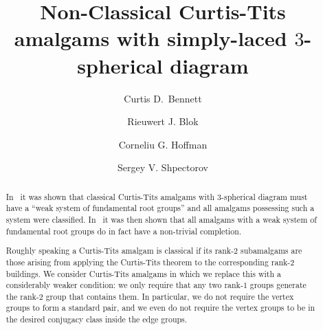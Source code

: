 \documentclass[12pt]{amsart}
\theoremstyle{definition}
\begin{document}
\title[Non-classical amalgams]{Non-Classical Curtis-Tits amalgams with simply-laced $3$-spherical diagram}

\author[Bennett]{Curtis D.~Bennett}
\address{Frank R. Seaver College of Science and Engineering \\
Loyola Marymount University\\
Los Angeles, CA 90245\\
U.S.A.
}

\author[Blok]{Rieuwert J. Blok}
\address{Department of Mathematics and Statistics\\
Bowling Green State University\\
Bowling Green, oh 43403\\
U.S.A.
}

\author[Hoffman]{Corneliu G. Hoffman}
\address{School of Mathematics\\
University of Birmingham\\
Edgbaston, B15 2TT\\
U.K.
}

\author[Shpectorov]{Sergey V. Shpectorov}
\address{School of Mathematics\\
University of Birmingham\\
Edgbaston, B15 2TT\\
U.K.}

\begin{abstract}
In~\cite{BlHoSh2017} it was shown that classical Curtis-Tits amalgams with $3$-spherical diagram must have a ``weak system of fundamental root groups'' and all amalgams possessing such a system were classified. In~\cite{BlHo2017} it was then shown that all amalgams with a weak system of fundamental root groups do in fact have a non-trivial completion. 

Roughly speaking a Curtis-Tits amalgam is classical if its rank-$2$ subamalgams are those arising from applying the Curtis-Tits theorem to the corresponding rank-$2$ buildings. We consider Curtis-Tits amalgams in which we replace this with a considerably weaker condition: we only require that any two rank-$1$ groups generate the rank-$2$ group that contains them. In particular, we do not require the vertex groups to form a standard pair, and we even do not require the vertex groups to be in the desired conjugacy class inside the edge groups.

\end{abstract}
\end{document}
